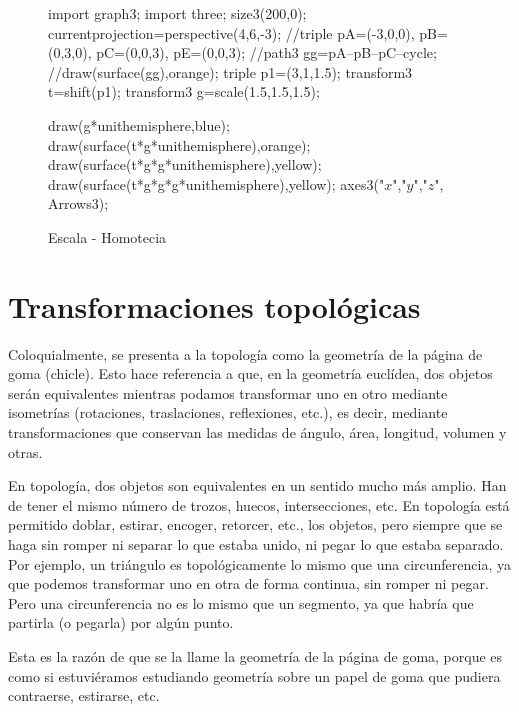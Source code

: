 \documentclass[a4paper]{book}
\begin{document}
\begin{figure}[!ht]
	\centering
	\begin{asy}
	import graph3;
	import three;
	size3(200,0);
	currentprojection=perspective(4,6,-3);
	//triple pA=(-3,0,0), pB=(0,3,0), pC=(0,0,3), pE=(0,0,3);
	//path3 gg=pA--pB--pC--cycle;
	//draw(surface(gg),orange);
	triple p1=(3,1,1.5);
	transform3 t=shift(p1);
	transform3 g=scale(1.5,1.5,1.5);

	draw(g*unithemisphere,blue);
	draw(surface(t*g*unithemisphere),orange);
	draw(surface(t*g*g*unithemisphere),yellow);
	draw(surface(t*g*g*g*unithemisphere),yellow);
	axes3("$x$","$y$","$z$", Arrows3);
	\end{asy}
	\caption{Escala - Homotecia}
\end{figure}



\section{Transformaciones topológicas}
Coloquialmente, se presenta a la topología como la geometría de la página de goma (chicle). Esto hace referencia a que, en la geometría euclídea, dos objetos serán equivalentes mientras podamos transformar uno en otro mediante isometrías (rotaciones, traslaciones, reflexiones, etc.), es decir, mediante transformaciones que conservan las medidas de ángulo, área, longitud, volumen y otras.

En topología, dos objetos son equivalentes en un sentido mucho más amplio. Han de tener el mismo número de trozos, huecos, intersecciones, etc. En topología está permitido doblar, estirar, encoger, retorcer, etc., los objetos, pero siempre que se haga sin romper ni separar lo que estaba unido, ni pegar lo que estaba separado. Por ejemplo, un triángulo es topológicamente lo mismo que una circunferencia, ya que podemos transformar uno en otra de forma continua, sin romper ni pegar. Pero una circunferencia no es lo mismo que un segmento, ya que habría que partirla (o pegarla) por algún punto.

Esta es la razón de que se la llame la geometría de la página de goma, porque es como si estuviéramos estudiando geometría sobre un papel de goma que pudiera contraerse, estirarse, etc.
\end{document}
